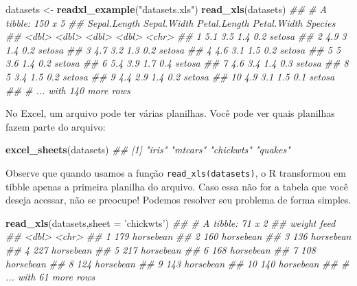\documentclass[]{book}
\newenvironment{Shaded}{\begin{snugshade}}{\end{snugshade}}
\newcommand{\CommentTok}[1]{\textcolor[rgb]{0.56,0.35,0.01}{\textit{#1}}}
\newcommand{\DataTypeTok}[1]{\textcolor[rgb]{0.13,0.29,0.53}{#1}}
\newcommand{\KeywordTok}[1]{\textcolor[rgb]{0.13,0.29,0.53}{\textbf{#1}}}
\newcommand{\NormalTok}[1]{#1}
\newcommand{\StringTok}[1]{\textcolor[rgb]{0.31,0.60,0.02}{#1}}
\begin{document}
\begin{Shaded}
\begin{Highlighting}[]
\NormalTok{datasets <-}\StringTok{ }\KeywordTok{readxl_example}\NormalTok{(}\StringTok{"datasets.xls"}\NormalTok{)}
\KeywordTok{read_xls}\NormalTok{(datasets)}
\CommentTok{## # A tibble: 150 x 5}
\CommentTok{##    Sepal.Length Sepal.Width Petal.Length Petal.Width Species}
\CommentTok{##           <dbl>       <dbl>        <dbl>       <dbl> <chr>  }
\CommentTok{##  1          5.1         3.5          1.4         0.2 setosa }
\CommentTok{##  2          4.9         3            1.4         0.2 setosa }
\CommentTok{##  3          4.7         3.2          1.3         0.2 setosa }
\CommentTok{##  4          4.6         3.1          1.5         0.2 setosa }
\CommentTok{##  5          5           3.6          1.4         0.2 setosa }
\CommentTok{##  6          5.4         3.9          1.7         0.4 setosa }
\CommentTok{##  7          4.6         3.4          1.4         0.3 setosa }
\CommentTok{##  8          5           3.4          1.5         0.2 setosa }
\CommentTok{##  9          4.4         2.9          1.4         0.2 setosa }
\CommentTok{## 10          4.9         3.1          1.5         0.1 setosa }
\CommentTok{## # ... with 140 more rows}
\end{Highlighting}
\end{Shaded}

No Excel, um arquivo pode ter várias planilhas. Você pode ver quais planilhas fazem parte do arquivo:

\begin{Shaded}
\begin{Highlighting}[]
\KeywordTok{excel_sheets}\NormalTok{(datasets)}
\CommentTok{## [1] "iris"     "mtcars"   "chickwts" "quakes"}
\end{Highlighting}
\end{Shaded}

Observe que quando usamos a função \texttt{read\_xls(datasets)}, o R transformou em tibble apenas a primeira planilha do arquivo. Caso essa não for a tabela que você deseja acessar, não se preocupe! Podemos resolver seu problema de forma simples.

\begin{Shaded}
\begin{Highlighting}[]
\KeywordTok{read_xls}\NormalTok{(datasets,}\DataTypeTok{sheet =} \StringTok{'chickwts'}\NormalTok{)}
\CommentTok{## # A tibble: 71 x 2}
\CommentTok{##    weight feed     }
\CommentTok{##     <dbl> <chr>    }
\CommentTok{##  1    179 horsebean}
\CommentTok{##  2    160 horsebean}
\CommentTok{##  3    136 horsebean}
\CommentTok{##  4    227 horsebean}
\CommentTok{##  5    217 horsebean}
\CommentTok{##  6    168 horsebean}
\CommentTok{##  7    108 horsebean}
\CommentTok{##  8    124 horsebean}
\CommentTok{##  9    143 horsebean}
\CommentTok{## 10    140 horsebean}
\CommentTok{## # ... with 61 more rows}
\end{Highlighting}
\end{Shaded}
\end{document}
